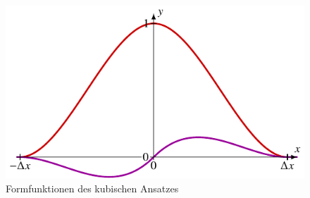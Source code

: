 %
%
%
\begin{figure}
    \centering
    \includegraphics{papers/fem/images/kubischer_ansatz.pdf}
    \caption{Formfunktionen des kubischen Ansatzes}
    \label{fem:1d:abb:kubisch}
    \end{figure}
    